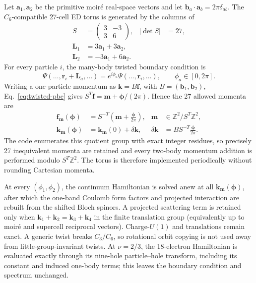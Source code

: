 \documentclass[10pt,twocolumn]{article}
\begin{document}
Let $\bm a_1,\bm a_2$ be the primitive moir\'e real-space vectors and let
$\bm b_a\!\cdot\!\bm a_b=2\pi\delta_{ab}$.  The $C_6$-compatible 27-cell
ED torus is generated by the columns of
\begin{equation}
 \begin{aligned}
 S&=\begin{pmatrix}3&-3\\3&6\end{pmatrix},& |\det S|&=27,\\
 \bm L_1&=3\bm a_1+3\bm a_2,\\
 \bm L_2&=-3\bm a_1+6\bm a_2.
 \end{aligned}
 \label{eq:supercell-pbc}
\end{equation}
For every particle $i$, the many-body twisted boundary condition is
\begin{equation}
 \Psi(\ldots,\bm r_i+\bm L_a,\ldots)
 =e^{i\phi_a}\Psi(\ldots,\bm r_i,\ldots),
 \qquad \phi_a\in[0,2\pi].
 \label{eq:twisted-pbc}
\end{equation}
Writing a one-particle momentum as $\bm k=B\bm f$, with
$B=(\bm b_1,\bm b_2)$, Eq.~\eqref{eq:twisted-pbc} gives
$S^T\bm f=\bm m+\bm\phi/(2\pi)$.  Hence the 27 allowed momenta are
\begin{align}
 \bm f_{\bm m}(\bm\phi)&=S^{-T}
 \left(\bm m+\frac{\bm\phi}{2\pi}\right),
 &\bm m&\in\mathbb Z^2/S^T\mathbb Z^2,\\
 \bm k_{\bm m}(\bm\phi)&=\bm k_{\bm m}(0)+\delta\bm k,
 &\delta\bm k&=B S^{-T}\frac{\bm\phi}{2\pi}.
 \label{eq:twist-kshift}
\end{align}
The code enumerates this quotient group with exact integer residues, so
precisely 27 inequivalent momenta are retained and every two-body momentum
addition is performed modulo $S^T\mathbb Z^2$.  The torus is therefore
implemented periodically without rounding Cartesian momenta.

At every $(\phi_1,\phi_2)$, the continuum Hamiltonian is solved anew at all
$\bm k_{\bm m}(\bm\phi)$, after which the one-band Coulomb form factors and
projected interaction are rebuilt from the shifted Bloch spinors.  A projected
scattering term is retained only when
$\bm k_1+\bm k_2=\bm k_3+\bm k_4$ in the finite translation group (equivalently
up to moir\'e and supercell reciprocal vectors).  Charge-$U(1)$ and translations
remain exact.  A generic twist breaks $C_3/C_6$, so rotational orbit copying is
not used away from little-group-invariant twists.  At $\nu=2/3$, the 18-electron
Hamiltonian is evaluated exactly through its nine-hole particle--hole
transform, including its constant and induced one-body terms; this leaves the
boundary condition and spectrum unchanged.
\end{document}
